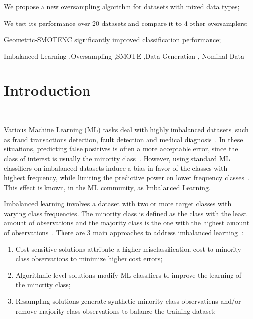 \documentclass[preprint,12pt]{elsarticle}
\begin{document}
{\begin{frontmatter}
\begin{highlights}
    \item We propose a new oversampling algorithm for datasets with mixed data
        types;
    \item We test its performance over 20 datasets and compare it to 4 other
        oversamplers;
    \item Geometric-SMOTENC significantly improved classification performance;
\end{highlights}

\begin{keyword}
Imbalanced Learning \sep Oversampling \sep SMOTE \sep Data Generation \sep
Nominal Data
\end{keyword}

\end{frontmatter}

\linenumbers%

\section{Introduction}~\label{sec:introduction}

Various Machine Learning (ML) tasks deal with highly imbalanced datasets, such
as fraud transactions detection, fault detection and medical
diagnosis~\cite{tyagi2020sampling}. In these situations, predicting false
positives is often a more acceptable error, since the class of interest is
usually the minority class~\cite{vuttipittayamongkol2021class}. However, using
standard ML classifiers on imbalanced datasets induce a bias in favor of the
classes with highest frequency, while limiting the predictive power on lower
frequency classes~\cite{lopez2013insight, das2018handling}. This effect is
known, in the ML community, as Imbalanced Learning. 

Imbalanced learning involves a dataset with two or more target classes with
varying class frequencies. The minority class is defined as the class
with the least amount of observations and the majority class is the one with the
highest amount of observations~\cite{kaur2019systematic}. There are 3 main
approaches to address imbalanced learning~\cite{fernandez2013analysing}: 

\begin{enumerate}
    \item Cost-sensitive solutions attribute a higher misclassification cost
        to minority class observations to minimize higher cost errors;
    \item Algorithmic level solutions modify ML classifiers to improve the
        learning of the minority class;
    \item Resampling solutions generate synthetic minority class observations
        and/or remove majority class observations to balance the training
        dataset;
\end{enumerate}

}
\end{document}
